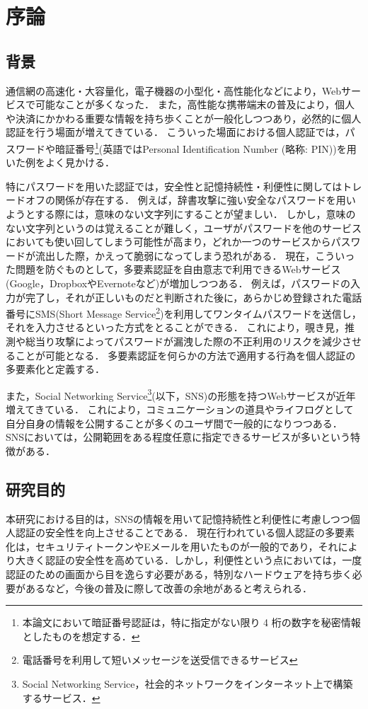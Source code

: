 \chapter{序論}\label{chap:introduction}
\section{背景}
通信網の高速化・大容量化，電子機器の小型化・高性能化などにより，Webサービスで可能なことが多くなった．
また，高性能な携帯端末の普及により，個人や決済にかかわる重要な情報を持ち歩くことが一般化しつつあり，必然的に個人認証を行う場面が増えてきている．
こういった場面における個人認証では，パスワードや暗証番号\footnote{本論文において暗証番号認証は，特に指定がない限り 4 桁の数字を秘密情報としたものを想定する．}(英語ではPersonal Identification Number (略称: PIN))を用いた例をよく見かける．

特にパスワードを用いた認証では，安全性と記憶持続性・利便性に関してはトレードオフの関係が存在する．
例えば，辞書攻撃に強い安全なパスワードを用いようとする際には，意味のない文字列にすることが望ましい．
しかし，意味のない文字列というのは覚えることが難しく，ユーザがパスワードを他のサービスにおいても使い回してしまう可能性が高まり，どれか一つのサービスからパスワードが流出した際，かえって脆弱になってしまう恐れがある．
現在，こういった問題を防ぐものとして，多要素認証を自由意志で利用できるWebサービス(Google\cite{google}，Dropbox\cite{dropbox}やEvernote\cite{evernote}など)が増加しつつある．
例えば，パスワードの入力が完了し，それが正しいものだと判断された後に，あらかじめ登録された電話番号にSMS(Short Message Service\footnote{電話番号を利用して短いメッセージを送受信できるサービス})を利用してワンタイムパスワードを送信し，それを入力させるといった方式をとることができる．
これにより，覗き見，推測や総当り攻撃によってパスワードが漏洩した際の不正利用のリスクを減少させることが可能となる．
多要素認証を何らかの方法で適用する行為を個人認証の多要素化と定義する．

また，Social Networking Service\footnote{Social Networking Service，社会的ネットワークをインターネット上で構築するサービス．}(以下，SNS)の形態を持つWebサービスが近年増えてきている．
これにより，コミュニケーションの道具やライフログとして自分自身の情報を公開することが多くのユーザ間で一般的になりつつある．
SNSにおいては，公開範囲をある程度任意に指定できるサービスが多いという特徴がある．

\section{研究目的}
本研究における目的は，SNSの情報を用いて記憶持続性と利便性に考慮しつつ個人認証の安全性を向上させることである．
現在行われている個人認証の多要素化は，セキュリティトークンやEメールを用いたものが一般的であり，それにより大きく認証の安全性を高めている．しかし，利便性という点においては，一度認証のための画面から目を逸らす必要がある，特別なハードウェアを持ち歩く必要があるなど，今後の普及に際して改善の余地があると考えられる．

